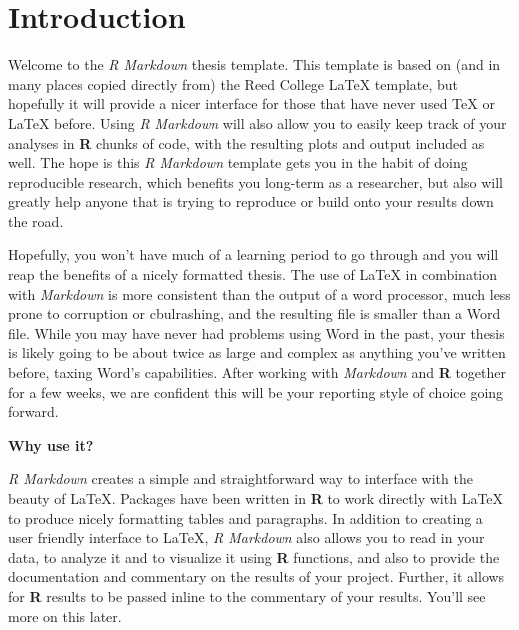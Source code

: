 \documentclass[12pt,twoside]{deuthesis}
\begin{document}
  \hypersetup{linkcolor=black}
  \setcounter{tocdepth}{2}
  \tableofcontents

  \listoftables

  \listoffigures


\newlength{\cslhangindent}
\setlength{\cslhangindent}{1.5em}
\newenvironment{CSLReferences}%
  {}%
  {\par}
\newenvironment{cslreferences}%
  {}%
  {\par}

\mainmatter %
\pagestyle{fancyplain} %

\hypertarget{introduction}{%
\chapter*{Introduction}\label{introduction}}

Welcome to the \emph{R Markdown} thesis template. This template is based on (and in many places copied directly from) the Reed College LaTeX template, but hopefully it will provide a nicer interface for those that have never used TeX or LaTeX before. Using \emph{R Markdown} will also allow you to easily keep track of your analyses in \textbf{R} chunks of code, with the resulting plots and output included as well. The hope is this \emph{R Markdown} template gets you in the habit of doing reproducible research, which benefits you long-term as a researcher, but also will greatly help anyone that is trying to reproduce or build onto your results down the road.

Hopefully, you won't have much of a learning period to go through and you will reap the benefits of a nicely formatted thesis. The use of LaTeX in combination with \emph{Markdown} is more consistent than the output of a word processor, much less prone to corruption or cbulrashing, and the resulting file is smaller than a Word file. While you may have never had problems using Word in the past, your thesis is likely going to be about twice as large and complex as anything you've written before, taxing Word's capabilities. After working with \emph{Markdown} and \textbf{R} together for a few weeks, we are confident this will be your reporting style of choice going forward.

\textbf{Why use it?}

\emph{R Markdown} creates a simple and straightforward way to interface with the beauty of LaTeX. Packages have been written in \textbf{R} to work directly with LaTeX to produce nicely formatting tables and paragraphs. In addition to creating a user friendly interface to LaTeX, \emph{R Markdown} also allows you to read in your data, to analyze it and to visualize it using \textbf{R} functions, and also to provide the documentation and commentary on the results of your project. Further, it allows for \textbf{R} results to be passed inline to the commentary of your results. You'll see more on this later.
\end{document}
